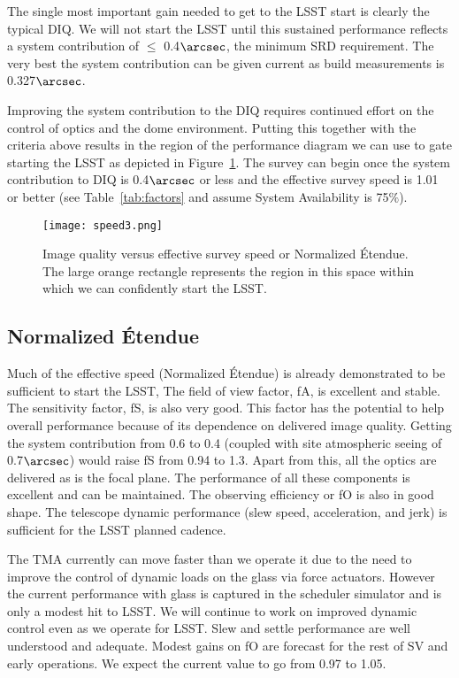 The single most important gain needed to get to the LSST start is clearly the typical DIQ. We will not start the LSST until this sustained performance reflects a system contribution of $\le$ 0.4$\arcsec$, the minimum SRD requirement. The very best the system contribution can be given current as build measurements is 0.327$\arcsec$. 

Improving the system contribution to the DIQ requires continued effort on the control of optics and the dome environment. Putting this together with the criteria above results in the region of the performance diagram we can use to gate starting the LSST as depicted in Figure~\ref{speed3}. The survey can begin once the system contribution to DIQ is 0.4$\arcsec$ or less and the effective survey speed is 1.01 or better (see Table~\ref{tab:factors} and assume System Availability is 75$\%$).

\begin{figure}[t]
  \centering
\texttt{[image: speed3.png]}
\caption{Image quality versus effective survey speed or Normalized \'{E}tendue. The large orange rectangle represents the region in this space within which we can confidently start the LSST.}
\label{speed3}
\end{figure}

\subsection{Normalized \'{E}tendue}
Much of the effective speed (Normalized  \'{E}tendue) is already demonstrated to be sufficient to start the LSST, The field of view factor, fA, is excellent and stable. The sensitivity factor, fS, is also very good. This factor has the potential to help overall performance because of its dependence on delivered image quality. Getting the system contribution from 0.6 to 0.4 (coupled with site atmospheric seeing of 0.7$\arcsec$) would raise fS from 0.94 to 1.3. Apart from this, all the optics are delivered as is the focal plane. The performance of all these components is excellent and can be maintained. The observing efficiency or fO is also in good shape. The telescope dynamic performance (slew speed, acceleration, and jerk) is sufficient for the LSST planned cadence. 

The TMA currently can move faster than we operate it due to the need to improve the control of dynamic loads on the glass via force actuators. However the current performance with glass is captured in the scheduler simulator and is only a modest hit to LSST. We will continue to work on improved dynamic control even as we operate for LSST. Slew and settle performance are well understood and adequate. Modest gains on fO are forecast for the rest of SV and early operations. We expect the current value to go from 0.97 to 1.05. 

